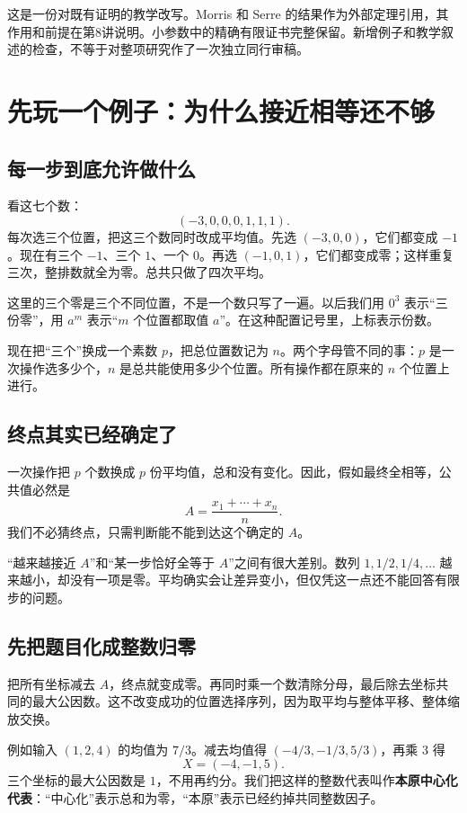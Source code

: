 \documentclass[11pt,a4paper,oneside,openany]{book}
\theoremstyle{definition}
\numberwithin{equation}{chapter}
\begin{document}
这是一份对既有证明的教学改写。Morris 和 Serre 的结果作为外部定理引用，其作用和前提在第8讲说明。小参数中的精确有限证书完整保留。新增例子和教学叙述的检查，不等于对整项研究作了一次独立同行审稿。

\tableofcontents
\mainmatter
\chapter{先玩一个例子：为什么接近相等还不够}\label{sec:main}
\section{每一步到底允许做什么}
看这七个数：
\[(-3,0,0,0,1,1,1).
\]
每次选三个位置，把这三个数同时改成平均值。先选 $(-3,0,0)$，它们都变成 $-1$。现在有三个 $-1$、三个 $1$、一个 $0$。再选 $(-1,0,1)$，它们都变成零；这样重复三次，整排数就全为零。总共只做了四次平均。

这里的三个零是三个不同位置，不是一个数只写了一遍。以后我们用 $0^3$ 表示“三份零”，用 $a^m$ 表示“$m$ 个位置都取值 $a$”。在这种配置记号里，上标表示份数。

现在把“三个”换成一个素数 $p$，把总位置数记为 $n$。两个字母管不同的事：$p$ 是一次操作选多少个，$n$ 是总共能使用多少个位置。所有操作都在原来的 $n$ 个位置上进行。

\section{终点其实已经确定了}
一次操作把 $p$ 个数换成 $p$ 份平均值，总和没有变化。因此，假如最终全相等，公共值必然是
\[A=\frac{x_1+\cdots+x_n}{n}.
\]
我们不必猜终点，只需判断能不能到达这个确定的 $A$。

“越来越接近 $A$”和“某一步恰好全等于 $A$”之间有很大差别。数列 $1,1/2,1/4,\ldots$ 越来越小，却没有一项是零。平均确实会让差异变小，但仅凭这一点还不能回答有限步的问题。

\section{先把题目化成整数归零}
把所有坐标减去 $A$，终点就变成零。再同时乘一个数清除分母，最后除去坐标共同的最大公因数。这不改变成功的位置选择序列，因为取平均与整体平移、整体缩放交换。

例如输入 $(1,2,4)$ 的均值为 $7/3$。减去均值得 $(-4/3,-1/3,5/3)$，再乘 $3$ 得
\[X=(-4,-1,5).
\]
三个坐标的最大公因数是 $1$，不用再约分。我们把这样的整数代表叫作\textbf{本原中心化代表}：“中心化”表示总和为零，“本原”表示已经约掉共同整数因子。
\end{document}
